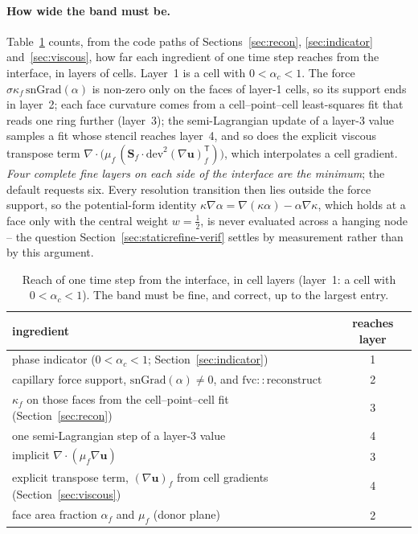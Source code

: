 \documentclass[preprint,3p,11pt]{elsarticle}
\begin{document}
\paragraph{How wide the band must be.}
Table~\ref{tab:layers} counts, from the code paths of Sections~\ref{sec:recon},
\ref{sec:indicator} and~\ref{sec:viscous}, how far each ingredient of one time step
reaches from the interface, in layers of cells. Layer~1 is a cell with $0<\alpha_c<1$.
The force $\sigma\kappa_f\,\mathrm{snGrad}(\alpha)$ is non-zero only on the faces of
layer-1 cells, so its support ends in layer~2; each face curvature comes from a
cell--point--cell least-squares fit that reads one ring further (layer~3); the
semi-Lagrangian update of a layer-3 value samples a fit whose stencil reaches layer~4,
and so does the explicit viscous transpose term
$\nabla\!\cdot\!\big(\mu_f\,(\mathbf S_f\!\cdot\!\mathrm{dev}^2(\nabla\mathbf u)_f^{\mathsf T})\big)$,
which interpolates a cell gradient. \emph{Four complete fine layers on each side of
the interface are the minimum}; the default requests six. Every resolution transition
then lies outside the force support, so the potential-form identity
$\kappa\nabla\alpha=\nabla(\kappa\alpha)-\alpha\nabla\kappa$, which holds at a face
only with the central weight $w=\tfrac12$, is never evaluated across a hanging node --
the question Section~\ref{sec:staticrefine-verif} settles by measurement rather than
by this argument.

\begin{table}[t]
  \centering
  \caption{Reach of one time step from the interface, in cell layers (layer~1: a cell
  with $0<\alpha_c<1$). The band must be fine, and correct, up to the largest entry.}
  \label{tab:layers}
  \begin{tabular}{lc}
    \hline
    ingredient & reaches layer \\
    \hline
    phase indicator ($0<\alpha_c<1$; Section~\ref{sec:indicator}) & 1 \\
    capillary force support, $\mathrm{snGrad}(\alpha)\neq0$, and $\mathrm{fvc::reconstruct}$ & 2 \\
    $\kappa_f$ on those faces from the cell--point--cell fit (Section~\ref{sec:recon}) & 3 \\
    one semi-Lagrangian step of a layer-3 value & 4 \\
    implicit $\nabla\!\cdot(\mu_f\nabla\mathbf u)$ & 3 \\
    explicit transpose term, $(\nabla\mathbf u)_f$ from cell gradients (Section~\ref{sec:viscous}) & 4 \\
    face area fraction $\alpha_f$ and $\mu_f$ (donor plane) & 2 \\
    \hline
  \end{tabular}
\end{table}
\end{document}
